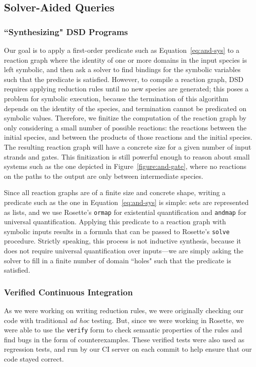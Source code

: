 \documentclass{article}[10pt]
\begin{document}
\subsection{Solver-Aided Queries}
\subsubsection{``Synthesizing" DSD Programs}
Our goal is to apply a first-order predicate such as Equation~\ref{eq:and-sys}
to a reaction graph where the identity of one or more domains in the input
species is left symbolic, and then ask a solver to find bindings for the
symbolic variables such that the predicate is satisfied. However,
to compile a reaction graph, DSD requires applying
reduction rules until no new species are generated; this poses a problem
for symbolic execution, because the termination of this algorithm
depends on the identity of the species, and termination cannot be
predicated on symbolic values. Therefore, we finitize the computation
of the reaction graph by only considering a small number of possible
reactions: the reactions between the initial species, and between
the products of those reactions and the initial species. The
resulting reaction graph will have a concrete size for a given
number of input strands and gates. This finitization
is still powerful enough to reason about small systems such as the one
depicted in Figure~\ref{figure:and-gate}, where no reactions on the
paths to the output are only between intermediate species.

Since all reaction graphs are of a finite size and concrete shape,
writing a predicate such as the one in Equation~\ref{eq:and-sys} is
simple: sets are represented as lists, and we use Rosette's \verb;ormap; for
existential quantification and \verb;andmap; for universal quantification.
Applying this predicate to a reaction graph with symbolic inputs results
in a formula that can be passed to Rosette's \verb;solve; procedure.
Strictly speaking, this process is not inductive synthesis, because it
does not require universal quantification over inputs---we are simply
asking the solver to fill in a finite number of domain ``holes" such that the
predicate is satisfied.

\subsubsection{Verified Continuous Integration}
As we were working on writing reduction rules, we were originally
checking our code with traditional \emph{ad hoc} testing. But,
since we were working in Rosette, we were able to use the \verb;verify;
form to check semantic properties of the rules and find bugs in the
form of counterexamples. These verified tests were also used as regression
tests, and run by our CI server on each commit to help ensure that our code
stayed correct.
\end{document}

